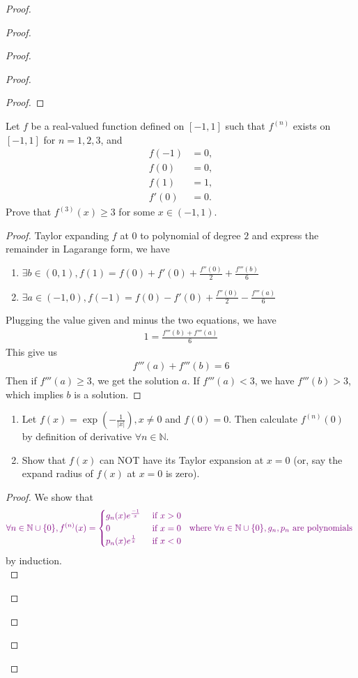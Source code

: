 \documentclass{report}
\begin{document}
\begin{proof}
\begin{proof}
\begin{proof}
\begin{proof}
\begin{proof}
\end{proof}
\begin{question}{}{}
Let \( f \) be a real-valued function defined on \([-1,1]\) such that \( f^{(n)} \) exists on \([-1,1]\) for \( n = 1,2,3 \), and
\begin{align*}
f(-1) &= 0, \\
f(0) &= 0, \\
f(1) &= 1, \\
f'(0) &= 0.
\end{align*}
Prove that \( f^{(3)}(x) \geq 3 \) for some \( x \in (-1,1) \).
\end{question}
\begin{proof}
Taylor expanding $f$ at  $0$ to polynomial of degree $2$ and express the remainder in Lagarange form, we have 
\begin{enumerate}[label=(\alph*)]
  \item $\exists b\in (0,1), f(1)=f(0)+f'(0)+\frac{f''(0)}{2}+\frac{f'''(b)}{6}$
  \item $\exists a\in (-1,0),f(-1)=f(0)-f'(0)+\frac{f''(0)}{2}-\frac{f'''(a)}{6}$
\end{enumerate}
Plugging the value given and minus the two equations, we have 
\begin{align*}
1=\frac{f'''(b)+f'''(a)}{6}
\end{align*}
This give us 
\begin{align*}
f'''(a)+f'''(b)=6
\end{align*}
Then if $f'''(a)\geq 3$, we get the solution $a$. If  $f'''(a)<3$, we have $f'''(b)>3$, which implies $b$ is a solution.
\end{proof}
\begin{question}{}{}
\begin{enumerate}
\item Let \( f(x) = \exp\left(-\frac{1}{|x|}\right), x \neq 0 \) and \( f(0) = 0 \). Then calculate \( f^{(n)}(0) \) by definition of derivative \( \forall n \in \mathbb{N} \).
\item Show that \( f(x) \) can NOT have its Taylor expansion at \( x = 0 \) (or, say the expand radius of \( f(x) \) at \( x = 0 \) is zero).
\end{enumerate}
\end{question}
\begin{proof}
We show that 
\begin{align*}
\textcolor{violet}{\forall n\in\mathbb{N} \cup \{ 0 \},f^{(n)}(x)=\begin{cases}
 g_n(x)e^{\frac{-1}{x}}& \text{ if $x>0$ }\\
 0& \text{ if $x=0$ }\\
 p_n(x)e^{\frac{1}{x}}& \text{ if $x<0$ }
\end{cases}\text{ where $\forall n\in\mathbb{N}\cup \{ 0 \},g_n,p_n$ are polynomials }}
\end{align*}
by induction.\\


\end{proof}
\end{proof}
\end{proof}
\end{proof}
\end{proof}
\end{document}
